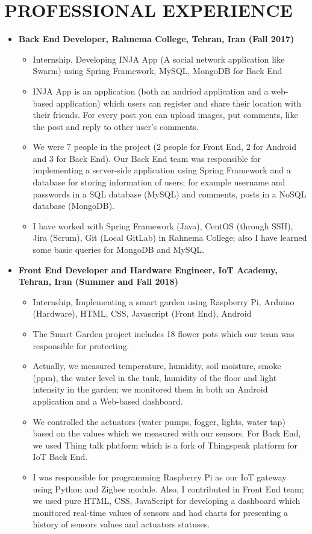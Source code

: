 \section{PROFESSIONAL EXPERIENCE}
\begin{itemize}
	\item \textbf{Back End Developer, Rahnema College, Tehran, Iran (Fall 2017)} 
		\begin{itemize}
			\item Internship, Developing INJA App (A social network application like Swarm) using Spring Framework, MySQL, MongoDB for Back End
				
				\item INJA App is an application (both an andriod application and a web-based application) which users can register and share their location with their friends. For every post you can upload images, put comments, like the post and reply to other user's comments. 
			\item We were 7 people in the project (2 people for Front End, 2 for Android and 3 for Back End). Our Back End team was responsible for implementing a server-side application using Spring Framework and a database for storing information of users; for example username and passwords in a SQL database (MySQL) and comments, posts in a NoSQL database (MongoDB).  
			\item I have worked with Spring Framework (Java), CentOS (through SSH), Jira (Scrum), Git (Local GitLab) in Rahnema College; also I have learned some basic queries for MongoDB and MySQL.
		\end{itemize}
			\vspace{+1 em}
		\item \textbf{Front End Developer and Hardware Engineer, IoT Academy, Tehran, Iran (Summer and Fall 2018)} 
		\begin{itemize}
			\item Internship, Implementing a smart garden using Raspberry Pi, Arduino (Hardware), HTML, CSS, Javascript (Front End), Android
			\item The Smart Garden project includes 18 flower pots which our team was responsible for protecting. 
			\item Actually, we measured temperature, humidity, soil moisture, smoke (ppm), the water level in the tank, humidity of the floor and light intensity in the garden; we monitored them in both an Android application and a Web-based dashboard.
			\item We controlled the actuators (water pumps, fogger, lights, water tap) based on the values which we measured with our sensors. For Back End, we used Thing talk platform which is a fork of Thingspeak platform for IoT Back End.
\item I was responsible for programming Raspberry Pi as our IoT gateway using Python and Zigbee module. Also, I contributed in Front End team; we used pure HTML, CSS, JavaScript for developing a dashboard which monitored real-time values of sensors and had charts for presenting a history of sensors values and actuators statuses.
		\end{itemize}
		

\end{itemize}
